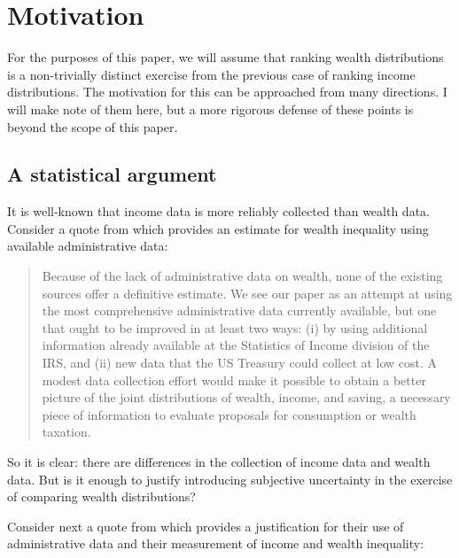 \documentclass[\econtexRoot/IneqMeas]{subfiles}
\begin{document}
\onlyinsubfile{\setcounter{section}{2}}
\section{Motivation}
\notinsubfile{\label{sec:Motivation}}


\par For the purposes of this paper, we will assume that ranking wealth distributions is a non-trivially distinct exercise from the previous case of ranking income distributions. The motivation for this can be approached from many directions. I will make note of them here, but a more rigorous defense of these points is beyond the scope of this paper.

\subsection{A statistical argument}

\par It is well-known that income data is more reliably collected than wealth data. Consider a quote from \cite{sz16} which provides an estimate for wealth inequality using available administrative data:

\begin{quote}

Because of the lack of administrative data on wealth, none of the existing sources offer a definitive estimate. We see our paper as an attempt at using the most comprehensive administrative data currently available, but one that ought to be improved in at least two ways: (i) by using additional information already available at the Statistics of Income division of the IRS, and (ii) new data that the US Treasury could collect at low cost. A modest data collection effort would make it possible to obtain a better picture of the joint distributions of wealth, income, and saving, a necessary piece of information to evaluate proposals for consumption or wealth taxation.

\end{quote}

\par So it is clear: there are differences in the collection of income data and wealth data. But is it enough to justify introducing subjective uncertainty in the exercise of comparing wealth distributions?

\par Consider next a quote from \cite{bks16} which provides a justification for their use of administrative data and their measurement of income and wealth inequality:
\end{document}
